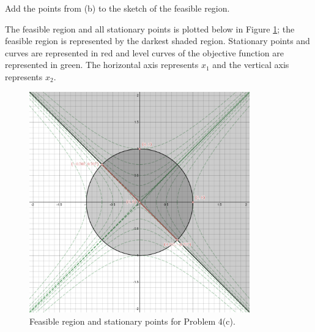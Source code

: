Add the points from (b) to the sketch of the feasible region.

\begin{solution}
    The feasible region and all stationary points is plotted below in Figure \ref{fig:problem_4c}; the feasible region 
    is represented by the darkest shaded region. Stationary points and curves are represented in red and level curves of
    the objective function are represented in green. The horizontal axis represents $x_1$ and the vertical axis 
    represents $x_2$.

    \begin{figure}[h]
        \centering
        \includegraphics*[width=0.85\textwidth]{problem_4c.png}
        \caption{Feasible region and stationary points for Problem 4(c).}
        \label{fig:problem_4c}
    \end{figure}
\end{solution}
